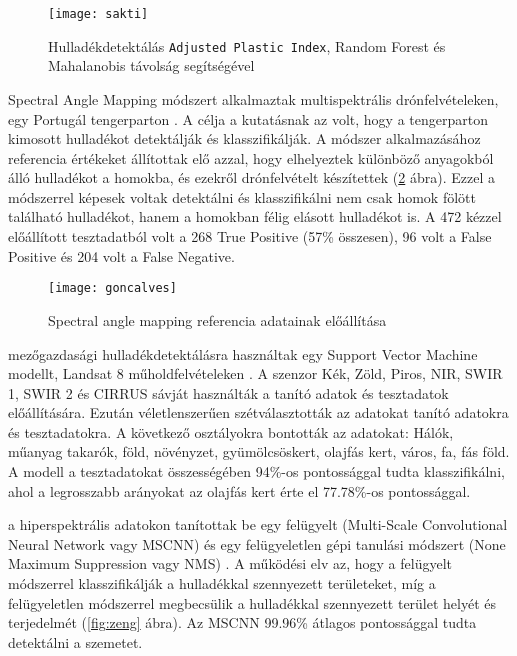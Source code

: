 \begin{figure}[H]
	\centering
	\texttt{[image: sakti]}
	\caption{Hulladékdetektálás \texttt{Adjusted Plastic Index}, Random Forest és Mahalanobis távolság segítségével \cite{sakti2023}}
    \label{fig:sakti}
\end{figure}


\citeauthor{goncalves2022} Spectral Angle Mapping módszert alkalmaztak multispektrális drónfelvételeken, egy Portugál tengerparton \cite{goncalves2022}. A célja a kutatásnak az volt, hogy a tengerparton kimosott hulladékot detektálják és klasszifikálják. A módszer alkalmazásához referencia értékeket állítottak elő azzal, hogy elhelyeztek különböző anyagokból álló hulladékot a homokba, és ezekről drónfelvételt készítettek (\ref{fig:goncalves} ábra). Ezzel a módszerrel képesek voltak detektálni és klasszifikálni nem csak homok fölött található hulladékot, hanem a homokban félig elásott hulladékot is. A 472 kézzel előállított tesztadatból volt a 268 True Positive (57\% összesen), 96 volt a False Positive és 204 volt a False Negative.

\begin{figure}[H]
	\centering
	\texttt{[image: goncalves]}
	\caption{Spectral angle mapping referencia adatainak előállítása \cite{goncalves2022}}
    \label{fig:goncalves}
\end{figure}

\citeauthor{lanorte2017} mezőgazdasági hulladékdetektálásra használtak egy Support Vector Machine modellt, Landsat 8 műholdfelvételeken \cite{lanorte2017}. A szenzor Kék, Zöld, Piros, NIR, SWIR 1, SWIR 2 és CIRRUS sávját használták a tanító adatok és tesztadatok előállítására. Ezután véletlenszerűen szétválasztották az adatokat tanító adatokra és tesztadatokra. A következő osztályokra bontották az adatokat: Hálók, műanyag takarók, föld, növényzet, gyümölcsöskert, olajfás kert, város, fa, fás föld. A modell a tesztadatokat összességében 94\%-os pontossággal tudta klasszifikálni, ahol a legrosszabb arányokat az olajfás kert érte el 77.78\%-os pontossággal.

\citeauthor{zeng2019} a hiperspektrális adatokon tanítottak be egy felügyelt (Multi-Scale Convolutional Neural Network vagy MSCNN) és egy felügyeletlen gépi tanulási módszert (None Maximum Suppression vagy NMS) \cite{zeng2019}. A működési elv az, hogy a felügyelt módszerrel klasszifikálják a hulladékkal szennyezett területeket, míg a felügyeletlen módszerrel megbecsülik a hulladékkal szennyezett terület helyét és terjedelmét (\ref{fig:zeng} ábra). Az MSCNN 99.96\% átlagos pontossággal tudta detektálni a szemetet.

